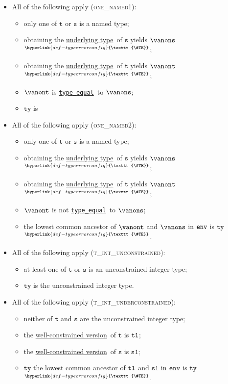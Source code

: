 \documentclass{book}
\newcommand\TypeErrorConfig[0]{\hyperlink{def-typeerrorconfig}{\texttt{\#TE}}}
\newcommand\ProseOrTypeError[0]{\hyperlink{def-proseortypeerror}{$^{\TypeErrorConfig}$}}
\newcommand\typeequal[0]{\hyperlink{def-typeequal}{\texttt{type\_equal}}}
\newcommand\underlyingtype[0]{\hyperlink{def-underlyingtype}{underlying type}}
\newcommand\wellconstrainedversion[0]{\hyperlink{def-towellconstrained}{well-constrained version}}
\newcommand\vt[0]{\texttt{t}}
\newcommand\vs[0]{\texttt{s}}
\newcommand\vsone[0]{\texttt{s1}}
\newcommand\tty[0]{\texttt{ty}}
\begin{document}
\begin{itemize}
\begin{itemize}
    \item All of the following apply (\textsc{one\_named1}):
    \begin{itemize}
      \item only one of $\vt$ or $\vs$ is a named type;
      \item obtaining the \underlyingtype\ of $\vs$ yields $\vanons$ \ProseOrTypeError;
      \item obtaining the \underlyingtype\ of $\vt$ yields $\vanont$ \ProseOrTypeError;
      \item $\vanont$ is \typeequal\ to $\vanons$;
      \item $\tty$ is
    \end{itemize}

    \item All of the following apply (\textsc{one\_named2}):
    \begin{itemize}
      \item only one of $\vt$ or $\vs$ is a named type;
      \item obtaining the \underlyingtype\ of $\vs$ yields $\vanons$ \ProseOrTypeError;
      \item obtaining the \underlyingtype\ of $\vt$ yields $\vanont$ \ProseOrTypeError;
      \item $\vanont$ is not \typeequal\ to $\vanons$;
      \item the lowest common ancestor of $\vanont$ and $\vanons$ in $\texttt{env}$ is $\tty$ \ProseOrTypeError.
    \end{itemize}

    \item All of the following apply (\textsc{t\_int\_unconstrained}):
    \begin{itemize}
      \item at least one of $\vt$ or $\vs$ is an unconstrained integer type;
      \item $\tty$ is the unconstrained integer type.
    \end{itemize}

    \item All of the following apply (\textsc{t\_int\_underconstrained}):
    \begin{itemize}
      \item neither of $\vt$ and $\vs$ are the unconstrained integer type;
      \item the \wellconstrainedversion\ of $\vt$ is $\texttt{t1}$;
      \item the \wellconstrainedversion\ of $\vs$ is $\vsone$;
      \item $\tty$ the lowest common ancestor of $\texttt{t1}$ and $\vsone$ in $\texttt{env}$ is $\tty$ \ProseOrTypeError.
    \end{itemize}


\end{itemize}
\end{itemize}
\end{document}

